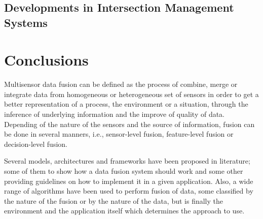 
\subsection{Developments in Intersection Management Systems}

\section{Conclusions}

Multisensor data fusion can be defined as the process of combine, merge or integrate data from homogeneous or heterogeneous set of sensors in order to get a better representation of a process, the environment or a situation, through the inference of underlying information and the improve of quality of data. Depending of the nature of the sensors and the source of information, fusion can be done in several manners, i.e., sensor-level fusion, feature-level fusion or decision-level fusion.

Several models, architectures and frameworks have been proposed in literature; some of them to show how a data fusion system should work and some other providing guidelines on how to implement it in a given application. Also, a wide range of algorithms have been used to perform fusion of data, some classified by the nature of the fusion or by the nature of the data, but is finally the environment and the application itself which determines the approach to use.

%